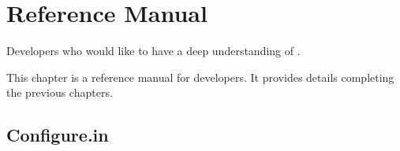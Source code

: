 
\chapter{Reference Manual}\label{chap:refman}

\begin{target}
Developers who would like to have a deep understanding of \framac.
\end{target}

This chapter is a reference manual for \framac developers. It provides details
completing the previous chapters.


\section{Configure.in} \label{refman:configure}

